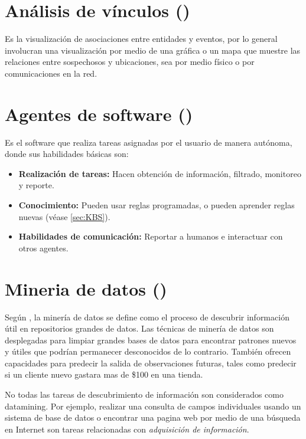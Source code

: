 
\section{Análisis de vínculos ()}
Es la visualización de asociaciones entre entidades y eventos, por lo general involucran una visualización por medio de una gráfica o un mapa que muestre las relaciones entre sospechosos y ubicaciones, sea por medio físico o por comunicaciones en la red.


\section{Agentes de software ()}
Es el software que realiza tareas asignadas por el usuario de manera autónoma, donde sus habilidades básicas son:
\begin{itemize}
\item \textbf{Realización de tareas:} Hacen obtención de información, filtrado, monitoreo y reporte.
\item \textbf{Conocimiento:} Pueden usar reglas programadas, o pueden aprender reglas nuevas (véase \ref{sec:KBS}).
\item \textbf{Habilidades de comunicación:} Reportar a humanos e interactuar con otros agentes.
\end{itemize}

\section{Mineria de datos ()} \label{sec:datamining}
Según \cite{tan2005introduction}, la minería de datos se define como el proceso de descubrir información útil en repositorios grandes de datos. Las técnicas de minería de datos son desplegadas para limpiar grandes bases de datos para encontrar patrones nuevos y útiles que podrían permanecer desconocidos de lo contrario. También ofrecen capacidades para predecir la salida de observaciones futuras, tales como predecir si un cliente nuevo gastara mas de \$100 en una tienda.

No todas las tareas de descubrimiento de información son considerados como \gls{datamining}. Por ejemplo, realizar una consulta de campos individuales usando un sistema de base de datos o encontrar una pagina web por medio de una búsqueda en Internet son tareas relacionadas con \emph{adquisición de información}.

